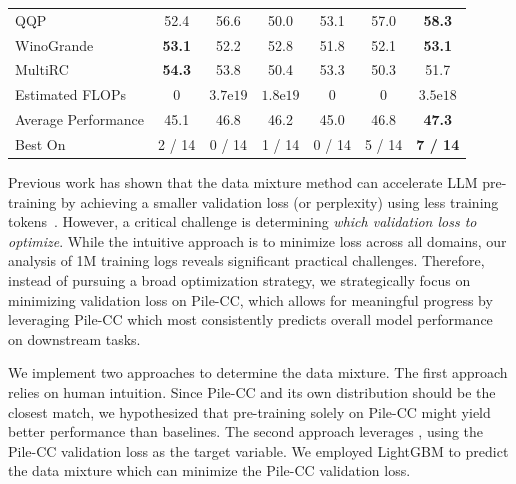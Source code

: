 \begin{table}[tb]
\begin{tabular}{l|cccccc}
        QQP~\citep{wang2018glue} & 52.4 & 56.6 & 50.0 & 53.1 & 57.0 & \textbf{58.3}  \\ 
        WinoGrande~\citep{sakaguchi2021winogrande} & \textbf{53.1} & 52.2 & 52.8 & 51.8 & 52.1 & \textbf{53.1}  \\ 
        MultiRC~\citep{khashabi2018looking} & \textbf{54.3} & 53.8 & 50.4 & 53.3 & 50.3 & 51.7 \\
        \midrule
        Estimated FLOPs & 0 & $3.7\text{e}19$ & $1.8\text{e}19$ & 0 & 0 & $3.5\text{e}18$ \\
        Average Performance & 45.1 & 46.8 & 46.2 & 45.0 & 46.8 & \textbf{47.3} \\
        Best On & 2 / 14 & 0 / 14 & 1 / 14 & 0 / 14 & 5 / 14 & \textbf{7 / 14} \\
    \bottomrule
    \end{tabular}
\end{table}

Previous work has shown that the data mixture method can accelerate LLM pre-training by achieving a smaller validation loss (or perplexity) using less training tokens~\citep{xie2023doremi}. However, a critical challenge is determining \textit{which validation loss to optimize}.
While the intuitive approach is to minimize loss across all domains, our analysis of 1M training logs reveals significant practical challenges.
Therefore, instead of pursuing a broad optimization strategy, we strategically focus on minimizing validation loss on Pile-CC, which allows for meaningful progress by leveraging Pile-CC which most consistently predicts overall model performance on downstream tasks.

We implement two approaches to determine the data mixture.
The first approach relies on human intuition.
Since Pile-CC and its own distribution should be the closest match, we hypothesized that pre-training solely on Pile-CC might yield better performance than baselines.
The second approach leverages \ourmethod, using the Pile-CC validation loss as the target variable. We employed LightGBM to predict the data mixture which can minimize the Pile-CC validation loss. 

